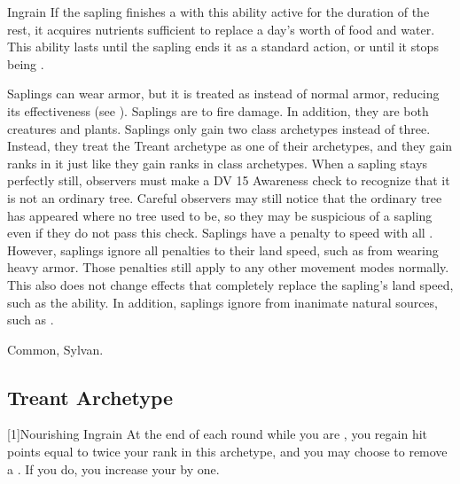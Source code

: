 \begin{itemize}
\begin{activeability}{Ingrain}
                If the sapling finishes a  with this ability active for the duration of the rest, it acquires nutrients sufficient to replace a day's worth of food and water.
                This ability lasts until the sapling ends it as a standard action, or until it stops being .
            \end{activeability}
         Saplings can wear armor, but it is treated as  instead of normal armor, reducing its effectiveness (see ).
         Saplings are \vulnerable to fire damage. In addition, they are both creatures and plants.
         Saplings only gain two class archetypes instead of three.
            Instead, they treat the Treant archetype as one of their archetypes, and they gain ranks in it just like they gain ranks in class archetypes.
         When a sapling stays perfectly still, observers must make a DV 15 Awareness check to recognize that it is not an ordinary tree.
        Careful observers may still notice that the ordinary tree has appeared where no tree used to be, so they may be suspicious of a sapling even if they do not pass this check.
         Saplings have a  penalty to speed with all .
            However, saplings ignore all penalties to their land speed, such as from wearing heavy armor.
            Those penalties still apply to any other movement modes normally.
            This also does not change effects that completely replace the sapling's land speed, such as the  ability.
            In addition, saplings ignore  from inanimate natural sources, such as .
    \end{itemize}
     Common, Sylvan.

    \subsection{Treant Archetype}

        [1]{Nourishing Ingrain} At the end of each round while you are , you regain hit points equal to twice your rank in this archetype, and you may choose to remove a .
        If you do, you increase your  by one.

